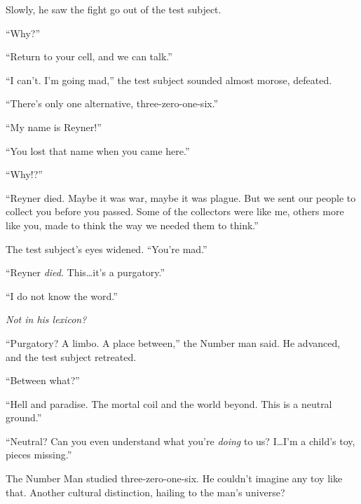 Slowly, he saw the fight go out of the test subject.



``Why?''



``Return to your cell, and we can talk.''



``I can't.  I'm going mad,'' the test subject sounded almost morose, defeated.



``There's only one alternative, three-zero-one-six.''



``My name is Reyner!''



``You lost that name when you came here.''



``Why!?''



``Reyner died.  Maybe it was war, maybe it was plague.  But we sent our people to collect you before you passed.  Some of the collectors were like me, others more like you, made to think the way we needed them to think.''



The test subject's eyes widened.  ``You're mad.''



``Reyner \emph{died}.  This\ldots it's a purgatory.''



``I do not know the word.''



\emph{Not in his lexicon?}



``Purgatory?  A limbo.  A place between,'' the Number man said.  He advanced, and the test subject retreated.



``Between what?''



``Hell and paradise.  The mortal coil and the world beyond.  This is a neutral ground.''



``Neutral?  Can you even understand what you're \emph{doing} to us?  I\ldots I'm a child's toy, pieces missing.''



The Number Man studied three-zero-one-six.  He couldn't imagine any toy like that.  Another cultural distinction, hailing to the man's universe?



